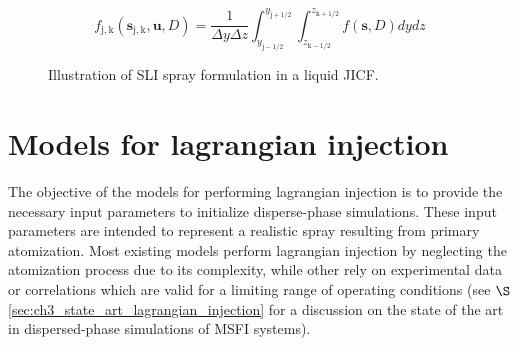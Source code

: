 \begin{equation}
\label{eg:f_discrete_jicf}
f_\mathrm{j,k} \left( \boldsymbol{s}_\mathrm{j,k}, \boldsymbol{u}, D \right) = \frac{1}{\Delta y \Delta z} \int_{y_\mathrm{j-1/2}}^{y_\mathrm{j+1/2}} \int_{z_\mathrm{k-1/2}}^{z_\mathrm{k+1/2}}  f \left( \boldsymbol{s}, D \right) dy dz
\end{equation}

\begin{figure}[h!]	
	\centering
	\caption{Illustration of SLI spray formulation in a liquid JICF.}
	\label{fig:JICF_spray_formulation}
\end{figure}


\section{Models for lagrangian injection}
	\label{sec:ch4_models_flowchart}
	
The objective of the models 	for performing lagrangian injection is to provide the necessary input parameters to initialize disperse-phase simulations. These input parameters are intended to represent a realistic spray resulting from primary atomization. Most existing models perform lagrangian injection by neglecting the atomization process due to its complexity, while other rely on experimental data or correlations which are valid for a limiting range of operating conditions (see $\S$\ref{sec:ch3_state_art_lagrangian_injection} for a discussion on the state of the art in dispersed-phase simulations of MSFI systems). 

